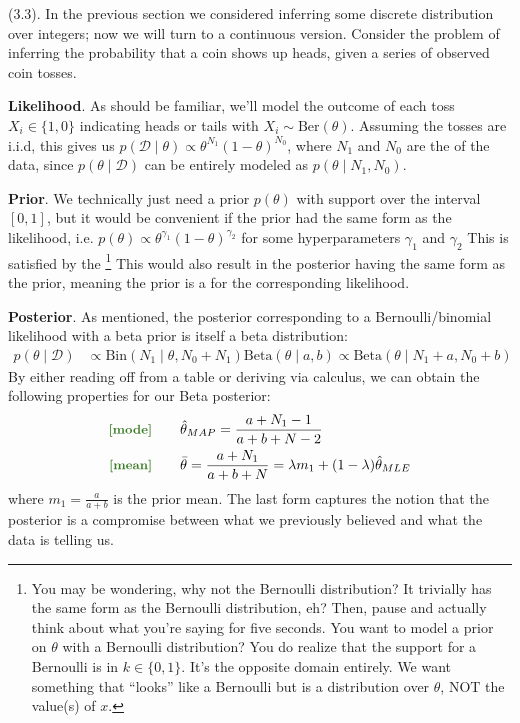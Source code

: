 \documentclass[11pt]{article}
\begin{document}
\myspace
\p {} (3.3). In the previous section we considered inferring some discrete distribution over integers; now we will turn to a continuous version. Consider the problem of inferring the probability that a coin shows up heads, given a series of observed coin tosses. 
\begin{compactitem}
	\item \textbf{Likelihood}. As should be familiar, we'll model the outcome of each toss $X_i \in \{1, 0\}$ indicating heads or tails with $X_i \sim \text{Ber}(\theta)$. Assuming the tosses are i.i.d, this gives us $p(\mathcal D \mid \theta) \propto \theta^{N_1} (1 - \theta)^{N_0}$, where $N_1$ and $N_0$ are the  of the data, since $p(\theta \mid \mathcal D)$ can be entirely modeled as $p(\theta \mid N_1, N_0)$. 
	
	\item \textbf{Prior}. We technically just need a prior $p(\theta)$ with support over the interval $[0, 1]$, but it would be convenient if the prior had the same form as the likelihood, i.e. $p(\theta) \propto \theta^{\gamma_1} (1 - \theta)^{\gamma_2}$ for some hyperparameters $\gamma_1$ and $\gamma_2$ This is satisfied by the \footnote{You may be wondering, why not the Bernoulli distribution? It trivially has the same form as the Bernoulli distribution, eh? Then, pause and actually think about what you're saying for five seconds. You want to model a prior on $\theta$ with a Bernoulli distribution? You do realize that the support for a Bernoulli is in $k \in \{0, 1\}$. It's the opposite domain entirely. We want something that ``looks'' like a Bernoulli but is a distribution over $\theta$, NOT the value(s) of $x$.} This would also result in the posterior having the same form as the prior, meaning the prior is a  for the corresponding likelihood.
	
	\item \textbf{Posterior}. As mentioned, the posterior corresponding to a Bernoulli/binomial likelihood with a beta prior is itself a beta distribution:
	\begin{align}
		p(\theta \mid \mathcal D) 
			&\propto \text{Bin}(N_1 \mid \theta, N_0 + N_1) \text{Beta}(\theta \mid a, b)
			\propto \text{Beta}(\theta \mid N_1 + a, N_0 + b) 
	\end{align}
	By either reading off from a table or deriving via calculus, we can obtain the following properties for our Beta posterior:
	\begin{align}
		\mtgreen{[mode]}& \qquad \hat{\theta}_{MAP}
			= \frac{a + N_1 - 1}{a + b + N - 2} \\
		\mtgreen{[mean]}& \qquad \bar{\theta}
			= \frac{a + N_1}{a + b + N} = \lambda m_1 + (1 - \lambda) \hat{\theta}_{MLE}
	\end{align}
	where $m_1=\tfrac{a}{a+b}$ is the prior mean. The last form captures the notion that the posterior is a compromise between what we previously believed and what the data is telling us. 
\end{compactitem}
\end{document}
